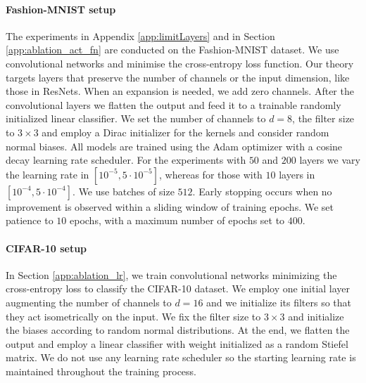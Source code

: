 \documentclass{article}
\theoremstyle{plain}
\theoremstyle{definition}
\theoremstyle{definition}
\theoremstyle{remark}
\theoremstyle{definition}
\theoremstyle{definition}
\theoremstyle{remark}
\numberwithin{equation}{section}
\begin{document}
\paragraph{Fashion-MNIST setup}
The experiments in Appendix \ref{app:limitLayers} and in Section \ref{app:ablation_act_fn} are conducted on the Fashion-MNIST dataset. We use convolutional networks and minimise the cross-entropy loss function. Our theory targets layers that preserve the number of channels or the input dimension, like those in ResNets. When an expansion is needed, we add zero channels. After the convolutional layers we flatten the output and feed it to a trainable randomly initialized linear classifier. We set the number of channels to $d = 8$, the filter size to $3 \times 3$ and employ a Dirac initializer for the kernels and consider random normal biases. 
All models are trained using the Adam optimizer with a cosine decay learning rate scheduler. For the experiments with $50$ and $200$ layers we vary the learning rate in $[10^{-5},5\cdot 10^{-5}]$, whereas for those with $10$ layers in $[10^{-4},5\cdot 10^{-4}]$. We use batches of size $512$. Early stopping occurs when no improvement is observed within a sliding window of training epochs. We set patience to $10$ epochs, with a maximum number of epochs set to $400$. 

\paragraph{CIFAR-10 setup} In Section \ref{app:ablation_lr}, we train convolutional networks minimizing the cross-entropy loss to classify the CIFAR-10 dataset. We employ one initial layer augmenting the number of channels to $d = 16$ and we initialize its filters so that they act isometrically on the input. We fix the filter size to $3 \times 3$ and initialize the biases according to random normal distributions. At the end, we flatten the output and employ a linear classifier with weight initialized as a random Stiefel matrix. We do not use any learning rate scheduler so the starting learning rate is maintained throughout the training process.
\end{document}
